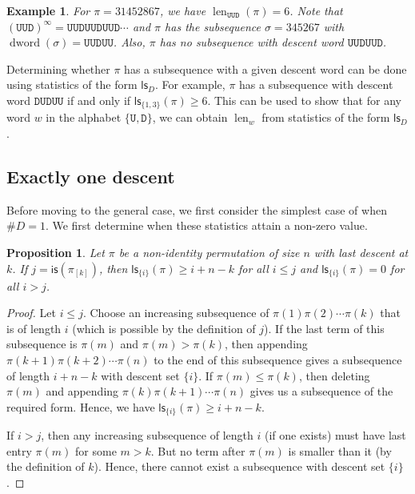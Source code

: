 \documentclass[12pt]{article}
\newcommand{\is}{\mathsf{is}}
\newcommand{\ls}{\mathsf{ls}}
\newcommand{\dword}{\operatorname{dword}}
\newcommand{\desword}[1]{\mathtt{#1}}
\newtheorem{example}[theorem]{Example}
\newtheorem{proposition}[theorem]{Proposition}
\theoremstyle{definition}
\begin{document}
\begin{example}
    For $\pi = 31452867$, we have $\operatorname{len}_{\desword{UUD}}(\pi) = 6$. 
    Note that $(\desword{UUD})^\infty = \desword{UUDUUDUUD}\cdots$ and $\pi$ has the subsequence $\sigma = 345267$ with $\dword(\sigma) = \desword{UUDUU}$. 
    Also, $\pi$ has no subsequence with descent word $\desword{UUDUUD}$.
\end{example}

Determining whether $\pi$ has a subsequence with a given descent word can be done using statistics of the form $\ls_D$. 
For example, $\pi$ has a subsequence with descent word $\desword{DUDUU}$ if and only if $\ls_{\{1, 3\}}(\pi) \geq 6$. 
This can be used to show that for any word $w$ in the alphabet $\{\desword{U}, \desword{D}\}$, we can obtain $\operatorname{len}_w$ from statistics of the form $\ls_D$.


\subsection{Exactly one descent}

Before moving to the general case, we first consider the simplest case of when $\#D = 1$. 
We first determine when these statistics attain a non-zero value.

\begin{proposition}\label{gsinonzero}
    Let $\pi$ be a non-identity permutation of size $n$ with last descent at $k$. 
    If $j = \is(\pi_{[k]})$, then $\ls_{\{i\}}(\pi) \geq i + n - k$ for all $i \leq j$ and $\ls_{\{i\}}(\pi) = 0$ for all $i > j$.
\end{proposition}

\begin{proof}
    Let $i \leq j$. 
    Choose an increasing subsequence of $\pi(1)\pi(2) \cdots \pi(k)$ that is of length $i$ (which is possible by the definition of $j$). 
    If the last term of this subsequence is $\pi(m)$ and $\pi(m) > \pi(k)$, then appending $\pi(k + 1)\pi(k + 2) \cdots \pi(n)$ to the end of this subsequence gives a subsequence of length $i + n - k$ with descent set $\{i\}$. 
    If $\pi(m) \leq \pi(k)$, then deleting $\pi(m)$ and appending $\pi(k)\pi(k + 1) \cdots \pi(n)$ gives us a subsequence of the required form. 
    Hence, we have $\ls_{\{i\}}(\pi) \geq i + n - k$.

    If $i > j$, then any increasing subsequence of length $i$ (if one exists) must have last entry $\pi(m)$ for some $m > k$. 
    But no term after $\pi(m)$ is smaller than it (by the definition of $k$). 
    Hence, there cannot exist a subsequence with descent set $\{i\}$.
\end{proof}
\end{document}
